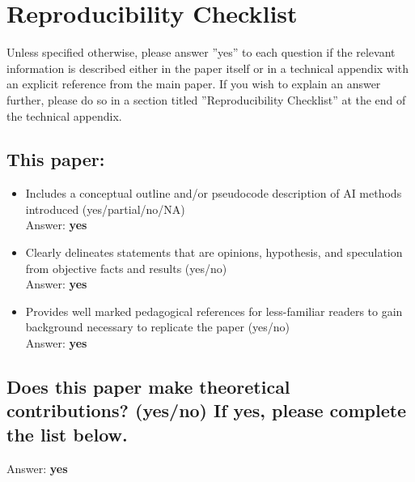 
\section*{Reproducibility Checklist}
\newcommand{\answerYes}{\textbf{yes}}
\newcommand{\answerNO}{\textbf{no}}
\newcommand{\answerNA}{\textbf{NA}}
\newcommand{\answerPartial}{\textbf{partial}}

Unless specified otherwise, please answer ''yes'' to each question if the relevant information is described either in the paper itself or in a technical appendix with an explicit reference from the main paper. If you wish to explain an answer further, please do so in a section titled ''Reproducibility Checklist'' at the end of the technical appendix.

\subsection*{This paper:}

\begin{itemize}
    \item Includes a conceptual outline and/or pseudocode description of AI methods introduced (yes/partial/no/NA)\\
    Answer: \answerYes{}
    \item Clearly delineates statements that are opinions, hypothesis, and speculation from objective facts and results (yes/no)\\
    Answer: \answerYes{}
    \item Provides well marked pedagogical references for less-familiar readers to gain background necessary to replicate the paper (yes/no)\\
    Answer: \answerYes{}
\end{itemize}

\subsection*{Does this paper make theoretical contributions? (yes/no) If yes, please complete the list below.}
Answer: \answerYes{}

